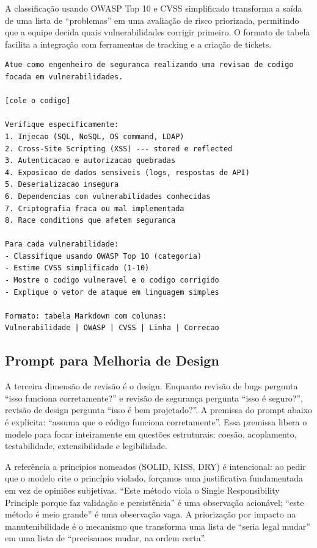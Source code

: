 A classificação usando OWASP Top 10 e CVSS simplificado transforma a saída de
uma lista de ``problemas'' em uma avaliação de risco priorizada, permitindo que a
equipe decida quais vulnerabilidades corrigir primeiro. O formato de tabela
facilita a integração com ferramentas de tracking e a criação de tickets.

\begin{lstlisting}[language={}, caption={Prompt para análise de segurança}]
Atue como engenheiro de seguranca realizando uma revisao de codigo
focada em vulnerabilidades.

[cole o codigo]

Verifique especificamente:
1. Injecao (SQL, NoSQL, OS command, LDAP)
2. Cross-Site Scripting (XSS) --- stored e reflected
3. Autenticacao e autorizacao quebradas
4. Exposicao de dados sensiveis (logs, respostas de API)
5. Deserializacao insegura
6. Dependencias com vulnerabilidades conhecidas
7. Criptografia fraca ou mal implementada
8. Race conditions que afetem seguranca

Para cada vulnerabilidade:
- Classifique usando OWASP Top 10 (categoria)
- Estime CVSS simplificado (1-10)
- Mostre o codigo vulneravel e o codigo corrigido
- Explique o vetor de ataque em linguagem simples

Formato: tabela Markdown com colunas:
Vulnerabilidade | OWASP | CVSS | Linha | Correcao
\end{lstlisting}

\subsection{Prompt para Melhoria de Design}

A terceira dimensão de revisão é o design. Enquanto revisão de bugs pergunta ``isso
funciona corretamente?'' e revisão de segurança pergunta ``isso é seguro?'',
revisão de design pergunta ``isso é bem projetado?''. A premissa do prompt abaixo
é explícita: ``assuma que o código funciona corretamente''. Essa premissa libera o
modelo para focar inteiramente em questões estruturais: coesão, acoplamento,
testabilidade, extensibilidade e legibilidade.

A referência a princípios nomeados (SOLID, KISS, DRY) é intencional: ao pedir
que o modelo cite o princípio violado, forçamos uma justificativa fundamentada
em vez de opiniões subjetivas. ``Este método viola o Single Responsibility
Principle porque faz validação e persistência'' é uma observação acionável;
``este método é meio grande'' é uma observação vaga. A priorização por impacto
na manutenibilidade é o mecanismo que transforma uma lista de ``seria legal
mudar'' em uma lista de ``precisamos mudar, na ordem certa''.

